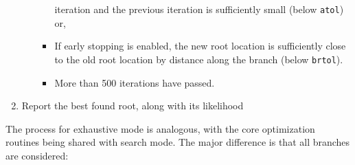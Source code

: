 \documentclass{article}
\begin{document}
\begin{enumerate}
\begin{enumerate}
\begin{itemize}
                        iteration and the previous iteration is sufficiently
                        small (below \texttt{atol}) or,
                  \item If early stopping is enabled, the new root location is
                        sufficiently close to the old root location by distance
                        along the branch (below \texttt{brtol}).
                  \item More than 500 iterations have passed.
                \end{itemize}
        \end{enumerate}
  \item Report the best found root, along with its likelihood
\end{enumerate}

The process for exhaustive mode is analogous, with the core optimization routines
being shared with search mode. The major difference is that all branches are
considered:
\end{document}
